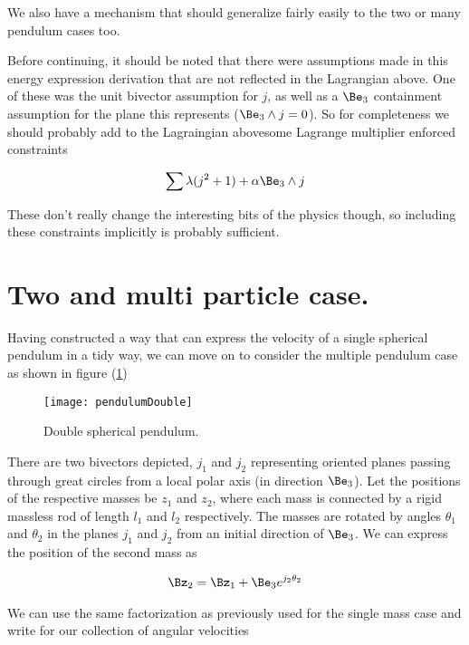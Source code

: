 We also have a mechanism that should generalize fairly easily to the two or many pendulum cases too.

Before continuing, it should be noted that there were assumptions made in this energy expression derivation that are not reflected in the Lagrangian above.  One of these was the unit bivector assumption for $j$, as well as a $\Be_3$ containment assumption for the plane this represents ($\Be_3 \wedge j = 0$).  So for completeness we should probably add to the Lagraingian abovesome Lagrange multiplier enforced constraints

\begin{align}\label{eqn:sPolarMultiPendulum:noo6}
\sum \lambda ( {j}^2 + 1 ) + \alpha \Be_3 \wedge j
\end{align}

These don't really change the interesting bits of the physics though, so including these constraints implicitly is probably sufficient.

\section{Two and multi particle case.}

Having constructed a way that can express the velocity of a single spherical pendulum in a tidy way, we can move on to consider the multiple pendulum case as shown in figure (\ref{fig:sPolarMultiPendulum:pendulumDouble})

\begin{figure}[htp]
\centering
\texttt{[image: pendulumDouble]}
\caption{Double spherical pendulum.}\label{fig:sPolarMultiPendulum:pendulumDouble}
\end{figure}

There are two bivectors depicted, $j_1$ and $j_2$ representing oriented planes passing through great circles from a local polar axis (in direction $\Be_3$).  Let the positions of the respective masses be $z_1$ and $z_2$, where each mass is connected by a rigid massless rod of length $l_1$ and $l_2$ respectively.  The masses are rotated by angles $\theta_1$ and $\theta_2$ in the planes $j_1$ and $j_2$ from an initial direction of $\Be_3$.  We can express the position of the second mass as

\begin{align}\label{eqn:sPolarMultiPendulum:zoo11a}
\Bz_2 = \Bz_1 + \Be_3 e^{j_2 \theta_2}
\end{align}

We can use the same factorization as previously used for the single mass case and write for our collection of angular velocities


